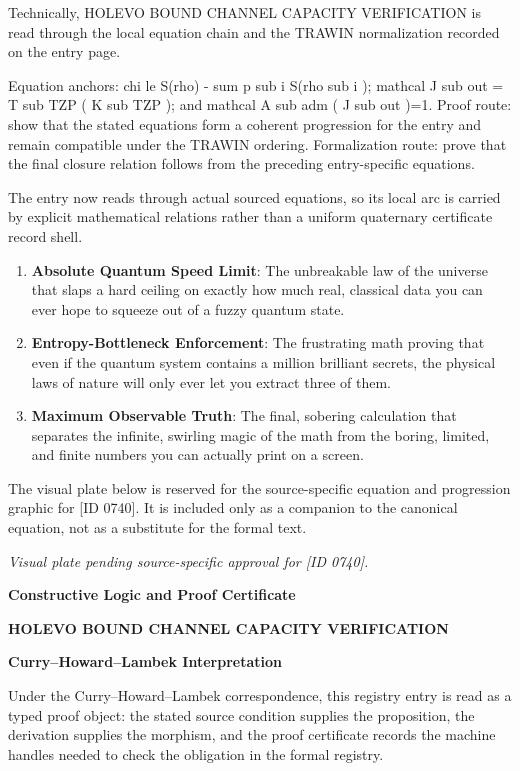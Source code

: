 Technically, HOLEVO BOUND CHANNEL CAPACITY VERIFICATION is read through the local equation chain and the TRAWIN normalization recorded on the entry page.

Equation anchors: chi le S(rho) - sum p sub i S(rho sub i ); mathcal J sub out = T sub TZP ( K sub TZP ); and mathcal A sub adm ( J sub out )=1. Proof route: show that the stated equations form a coherent progression for the entry and remain compatible under the TRAWIN ordering. Formalization route: prove that the final closure relation follows from the preceding entry-specific equations.

The entry now reads through actual sourced equations, so its local arc is carried by explicit mathematical relations rather than a uniform quaternary certificate record shell.
\endgroup

\begin{enumerate}[leftmargin=1.6em,itemsep=6pt,topsep=4pt]
\item \textbf{Absolute Quantum Speed Limit}: The unbreakable law of the universe that slaps a hard ceiling on exactly how much real, classical data you can ever hope to squeeze out of a fuzzy quantum state.
\item \textbf{Entropy-Bottleneck Enforcement}: The frustrating math proving that even if the quantum system contains a million brilliant secrets, the physical laws of nature will only ever let you extract three of them.
\item \textbf{Maximum Observable Truth}: The final, sobering calculation that separates the infinite, swirling magic of the math from the boring, limited, and finite numbers you can actually print on a screen.
\end{enumerate}

\begingroup\footnotesize\sloppy
The visual plate below is reserved for the source-specific equation and progression graphic for [ID 0740]. It is included only as a companion to the canonical equation, not as a substitute for the formal text.
\par\endgroup
\begingroup\footnotesize\itshape
Visual plate pending source-specific approval for [ID 0740].
\par\endgroup

\clearpage
\begingroup\tzpsupportsetup
\noindent\textbf{\fontsize{10.8pt}{12.8pt}\selectfont [ID 0740] Constructive Logic and Proof Certificate}\par
\noindent\textbf{\fontsize{10pt}{12pt}\selectfont HOLEVO BOUND CHANNEL CAPACITY VERIFICATION}\par
\vspace{0.45em}
\begingroup
\footnotesize
\setlength{\parskip}{0.22em}
\setlength{\parindent}{0pt}
\noindent\textbf{Curry--Howard--Lambek Interpretation}\par
Under the Curry--Howard--Lambek correspondence, this registry entry is read as a typed proof
object: the stated source condition supplies the proposition, the derivation supplies the
morphism, and the proof certificate records the machine handles needed to check the obligation
in the formal registry.

